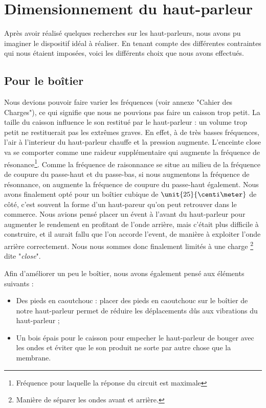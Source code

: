 

\section{Dimensionnement du haut-parleur}
Après avoir réalisé quelques recherches sur les haut-parleurs, nous avons pu imaginer le dispositif idéal 
à réaliser. En tenant compte des différentes contraintes qui nous étaient imposées, voici les différents 
choix que nous avons effectués.

\subsection{Pour le boîtier}
Nous devions pouvoir faire varier les fréquences (voir annexe "Cahier des Charges"), ce qui signifie que nous ne 
pouvions pas faire un caisson trop petit. La taille du caisson influence le son restitué par le haut-parleur :
un volume trop petit ne restituerait pas les extrêmes graves. En effet, à de très basses 
fréquences, l'air à  l'interieur du haut-parleur chauffe et la pression augmente.  
L'enceinte close va se comporter comme une raideur supplémentaire qui augmente la fréquence de
résonance\footnote{Fréquence pour laquelle la réponse du circuit est maximale}.  Comme la fréquence de raisonnance se 
situe au milieu de la fréquence de coupure du passe-haut et du passe-bas, si nous augmentons la fréquence de résonnance, 
on augmente la fréquence de coupure du passe-haut\cite{volume} également. Nous avons finalement opté pour un boîtier cubique de 
$\unit{25}{\centi\meter}$ de côté, c'est souvent la forme d'un haut-pareur qu'on peut retrouver dans le commerce.
Nous avions pensé placer un évent à l'avant du haut-parleur pour augmenter le rendement en profitant de l'onde 
arrière, mais c'était plus difficile à construire, et il aurait fallu que l'on accorde l'event, de manière à
exploiter l'onde arrière correctement. Nous nous sommes donc finalement limités à une charge
\footnote{Manière de séparer les ondes avant et arrière.} dite "\textit{close}"\cite{close}.  

Afin d'améliorer un peu le boîtier, nous avons également pensé aux éléments suivants :

\begin{itemize}
	\item	Des pieds en caoutchouc : placer des pieds en caoutchouc sur le boîtier de notre haut-parleur
				permet de réduire les déplacements dûs aux vibrations du haut-parleur ;
	\item	Un bois épais pour le caisson pour empecher le haut-parleur de bouger avec les ondes et éviter que 
	le son produit ne sorte par autre chose que la membrane.
	
\end{itemize}

